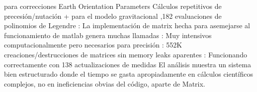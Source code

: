 \markdownRendererUlItem {} para correcciones Earth Orientation Parameters\markdownRendererUlItemEnd 
\markdownRendererUlItem Cálculos repetitivos de precesión/nutación\markdownRendererUlItemEnd 
\markdownRendererUlEndTight \markdownRendererInterblockSeparator
{}
\markdownRendererSectionEnd \markdownRendererSectionBegin
{}\markdownRendererInterblockSeparator
{}\markdownRendererUlBeginTight
\markdownRendererUlItem {} +  para el modelo gravitacional\markdownRendererUlItemEnd 
{},182 evaluaciones de polinomios de Legendre\markdownRendererUlItemEnd 
\markdownRendererUlEndTight \markdownRendererInterblockSeparator
{}
\markdownRendererSectionEnd 
\markdownRendererSectionEnd \markdownRendererSectionBegin
{}\markdownRendererInterblockSeparator
{}\markdownRendererUlBeginTight
\markdownRendererUlItem {}: La implementación de matrix hecha para asemejarse al funcionamiento de matlab genera muchas llamadas\markdownRendererUlItemEnd 
\markdownRendererUlItem {}: Muy intensivos computacionalmente pero necesarios para precisión\markdownRendererUlItemEnd 
\markdownRendererUlItem {}: 552K creaciones/destrucciones de matrices sin memory leaks aparentes\markdownRendererUlItemEnd 
\markdownRendererUlItem {}: Funcionando correctamente con 138 actualizaciones de medidas\markdownRendererUlItemEnd 
\markdownRendererUlEndTight \markdownRendererInterblockSeparator
{}
\markdownRendererSectionEnd \markdownRendererSectionBegin
{}\markdownRendererInterblockSeparator
{}El análisis muestra un sistema bien estructurado donde el tiempo se gasta apropiadamente en cálculos científicos complejos, no en ineficiencias obvias del código, aparte de Matrix.
\markdownRendererSectionEnd 
\markdownRendererSectionEnd \markdownRendererDocumentEnd